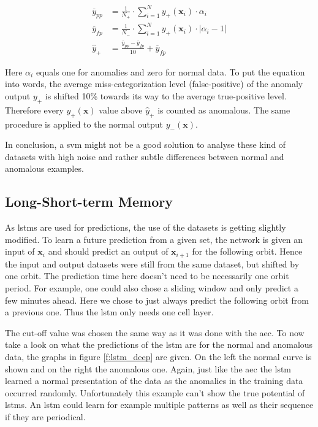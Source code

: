 	\begin{align*}
	\overline{y}_{pp} &= \frac{1}{N_+}\cdot \sum_{i=1}^N y_+ (\mathbf{x}_i) \cdot \alpha_i \\
	\overline{y}_{fp} &= \frac{1}{N_-}\cdot \sum_{i=1}^N y_+ (\mathbf{x}_i) \cdot \left| \alpha_i - 1 \right| \\
	\hat{y}_+ &= \frac{\overline{y}_{pp} - \overline{y}_{fp}}{10} + \overline{y}_{fp}
	\end{align*}

	Here $\alpha_i$ equals one for anomalies and zero for normal data. To put the equation into words, the average miss-categorization level (false-positive) of the anomaly output $y_+$ is shifted 10\% towards its way to the average true-positive level. Therefore every $y_+(\mathbf{x})$ value above $\hat{y}_+$ is counted as anomalous. The same procedure is applied to the normal output $y_-(\mathbf{x})$.
	
	In conclusion, a \ac{svm} might not be a good solution to analyse these kind of datasets with high noise and rather subtle differences between normal and anomalous examples.
	
	\subsection{Long-Short-term Memory}
	As \acp{lstm} are used for predictions, the use of the datasets is getting slightly modified. To learn a future prediction from a given set, the network is given an input of $\mathbf{x}_i$ and should predict an output of $\mathbf{x}_{i+1}$ for the following orbit. Hence the input and output datasets were still from the same dataset, but shifted by one orbit. \newline
	The prediction time here doesn't need to be necessarily one orbit period. For example, one could also chose a sliding window and only predict a few minutes ahead. Here we chose to just always predict the following orbit from a previous one. Thus the \ac{lstm} only needs one cell layer. 

	The cut-off value was chosen the same way as it was done with the \ac{aec}. To now take a look on what the predictions of the \ac{lstm} are for the normal and anomalous data, the graphs in figure \ref{f:lstm_deep} are given. On the left the normal curve is shown and on the right the anomalous one. Again, just like the \ac{aec} the \ac{lstm} learned a normal presentation of the data as the anomalies in the training data occurred randomly. \newline
	Unfortunately this example can't show the true potential of \acp{lstm}. An \ac{lstm} could learn for example multiple patterns as well as their sequence if they are periodical.
		
